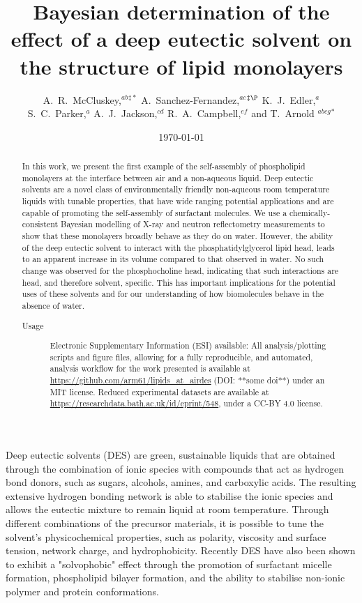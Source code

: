 \documentclass[twocolumn,a4paper]{paper}
\title{Bayesian determination of the effect of a deep eutectic solvent on the structure of lipid monolayers}
\author{A.~R.~McCluskey,\textit{$^{ab}$}$^{\ddag\ast}$ A.~Sanchez-Fernandez,\textit{$^{ac}$}$^{\ddag\P}$ K.~J.~Edler,\textit{$^{a}$} \\
S.~C.~Parker,\textit{$^{a}$} A.~J.~Jackson,\textit{$^{cd}$} R.~A.~Campbell,\textit{$^{ef}$} and T.~Arnold \textit{$^{abcg}$}$^{\ast}$}
\date{\today}
\begin{document}
\maketitle

\begin{abstract}
In this work, we present the first example of the self-assembly of phospholipid monolayers at the interface between air and a non-aqueous liquid.
Deep eutectic solvents are a novel class of environmentally friendly non-aqueous room temperature liquids with tunable properties, that have wide ranging potential applications and are capable of promoting the self-assembly of surfactant molecules.
We use a chemically-consistent Bayesian modelling of X-ray and neutron reflectometry measurements to show that these monolayers broadly behave as they do on water.
However, the ability of the deep eutectic solvent to interact with the phosphatidylglycerol lipid head, leads to an apparent increase in its volume compared to that observed in water.
No such change was observed for the phosphocholine head, indicating that such interactions are head, and therefore solvent, specific.
This has important implications for the potential uses of these solvents and for our understanding of how biomolecules behave in the absence of water.
\begin{description}
\item[Usage]
Electronic Supplementary Information (ESI) available: All analysis/plotting scripts and figure files, allowing for a fully reproducible, and automated, analysis workflow for the work presented is available at \url{https://github.com/arm61/lipids_at_airdes} (DOI: **some doi**) under an MIT license.
Reduced experimental datasets are available at \url{https://researchdata.bath.ac.uk/id/eprint/548}, under a CC-BY 4.0 license.
\end{description}
\end{abstract}


Deep eutectic solvents (DES) are green, sustainable liquids that are obtained through the combination of ionic species with compounds that act as hydrogen bond donors, such as sugars, alcohols, amines, and carboxylic acids\cite{Smith2014,Dai2013}.
The resulting extensive hydrogen bonding network is able to stabilise the ionic species and allows the eutectic mixture to remain liquid at room temperature\cite{Hammond2016,Hammond2017,Araujo2017}.
Through different combinations of the precursor materials, it is possible to tune the solvent's physicochemical properties, such as polarity\cite{Pandey2014}, viscosity and surface tension\cite{Smith2014}, network charge\cite{Zahn2016}, and hydrophobicity\cite{Ribeiro2015,vanOsch2015}.
Recently DES have also been shown to exhibit a "solvophobic" effect through the promotion of surfactant micelle formation\cite{Sanchez-Fernandez2016,Arnold2015,Hsieh2018,Banjare2018}, phospholipid bilayer formation\cite{Bryant2017,Bryant2016,Gutierrez2009}, and the ability to stabilise non-ionic polymer\cite{Sapir2016} and protein conformations\cite{Sanchez-Fernandez2017}.
\end{document}
